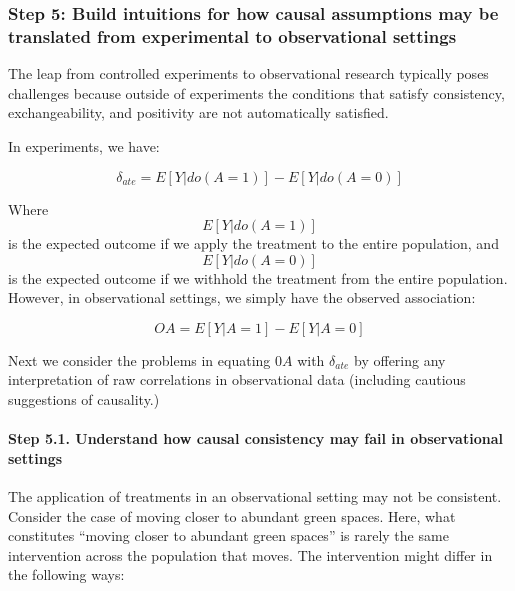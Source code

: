 \documentclass[
  singlecolumn]{article}
\let\oldparagraph\paragraph
\renewcommand{\paragraph}[1]{\oldparagraph{#1}\mbox{}}
\begin{document}
\hypertarget{step-5-build-intuitions-for-how-causal-assumptions-may-be-translated-from-experimental-to-observational-settings}{%
\subsubsection{Step 5: Build intuitions for how causal assumptions may
be translated from experimental to observational
settings}\label{step-5-build-intuitions-for-how-causal-assumptions-may-be-translated-from-experimental-to-observational-settings}}

The leap from controlled experiments to observational research typically
poses challenges because outside of experiments the conditions that
satisfy consistency, exchangeability, and positivity are not
automatically satisfied.

In experiments, we have:

\[
\delta_{ate} = E[Y | do(A = 1)] - E[Y | do(A = 0)]
\]

Where \[E[Y | do(A = 1)]\] is the expected outcome if we apply the
treatment to the entire population, and \[E[Y | do(A = 0)]\] is the
expected outcome if we withhold the treatment from the entire
population. However, in observational settings, we simply have the
observed association:

\[
OA = E[Y | A = 1] - E[Y | A = 0]
\]

Next we consider the problems in equating \(0A\) with \(\delta_{ate}\)
by offering any interpretation of raw correlations in observational data
(including cautious suggestions of causality.)

\hypertarget{step-5.1.-understand-how-causal-consistency-may-fail-in-observational-settings}{%
\paragraph{\texorpdfstring{\textbf{Step 5.1. Understand how causal
consistency may fail in observational
settings}}{Step 5.1. Understand how causal consistency may fail in observational settings}}\label{step-5.1.-understand-how-causal-consistency-may-fail-in-observational-settings}}

The application of treatments in an observational setting may not be
consistent. Consider the case of moving closer to abundant green spaces.
Here, what constitutes ``moving closer to abundant green spaces'' is
rarely the same intervention across the population that moves. The
intervention might differ in the following ways:
\end{document}
